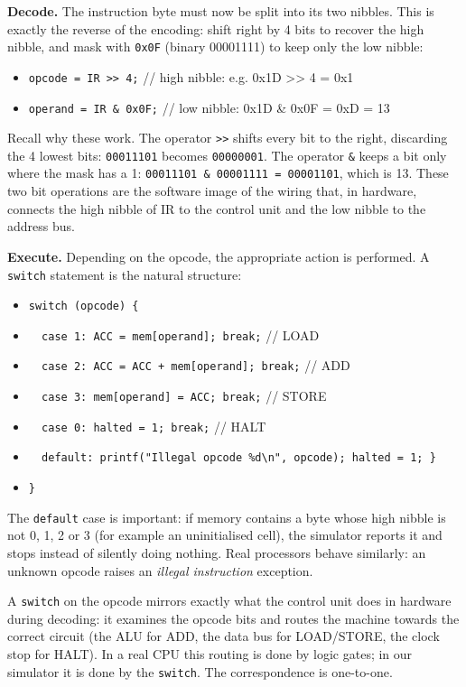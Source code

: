 \documentclass[11pt]{article}
\newcommand{\cle}[1]{{\popxbold\color{popdark}#1}}
\begin{document}
\textbf{Decode.} The instruction byte must now be split into its two nibbles. This is exactly the reverse of the encoding: shift right by 4 bits to recover the high nibble, and mask with \texttt{0x0F} (binary 00001111) to keep only the low nibble:

\begin{itemize}
\item \texttt{opcode = IR >> 4;} \quad // high nibble: e.g. 0x1D >> 4 = 0x1
\item \texttt{operand = IR \& 0x0F;} \quad // low nibble: 0x1D \& 0x0F = 0xD = 13
\end{itemize}

Recall why these work. The operator \texttt{>>} shifts every bit to the right, discarding the 4 lowest bits: \texttt{00011101} becomes \texttt{00000001}. The operator \texttt{\&} keeps a bit only where the mask has a 1: \texttt{00011101 \& 00001111 = 00001101}, which is 13. These two bit operations are the software image of the wiring that, in hardware, connects the high nibble of IR to the control unit and the low nibble to the address bus.

\textbf{Execute.} Depending on the opcode, the appropriate action is performed. A \texttt{switch} statement is the natural structure:

\begin{itemize}
\item \texttt{switch (opcode) \{}
\item \texttt{\ \ case 1: ACC = mem[operand]; break;} \quad // LOAD
\item \texttt{\ \ case 2: ACC = ACC + mem[operand]; break;} \quad // ADD
\item \texttt{\ \ case 3: mem[operand] = ACC; break;} \quad // STORE
\item \texttt{\ \ case 0: halted = 1; break;} \quad // HALT
\item \texttt{\ \ default: printf("Illegal opcode \%d\textbackslash n", opcode); halted = 1; \}}
\item \texttt{\}}
\end{itemize}

The \texttt{default} case is important: if memory contains a byte whose high nibble is not 0, 1, 2 or 3 (for example an uninitialised cell), the simulator reports it and stops instead of silently doing nothing. Real processors behave similarly: an unknown opcode raises an \emph{illegal instruction} exception.

\begin{propriete}
A \texttt{switch} on the opcode mirrors exactly what the \cle{control unit} does in hardware during decoding: it examines the opcode bits and routes the machine towards the correct circuit (the ALU for ADD, the data bus for LOAD/STORE, the clock stop for HALT). In a real CPU this routing is done by logic gates; in our simulator it is done by the \texttt{switch}. The correspondence is one-to-one.
\end{propriete}
\end{document}
